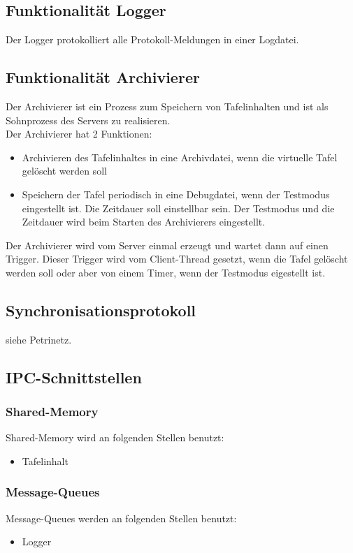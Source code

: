 \subsection{Funktionalität Logger}
Der Logger protokolliert alle Protokoll-Meldungen in einer Logdatei.

\subsection{Funktionalität Archivierer}
Der Archivierer ist ein Prozess zum Speichern von Tafelinhalten und ist als Sohnprozess des Servers zu realisieren. \\
Der Archivierer hat 2 Funktionen:
\begin{itemize}
 \item Archivieren des Tafelinhaltes in eine Archivdatei, wenn die virtuelle Tafel gelöscht werden soll
 \item Speichern der Tafel periodisch in eine Debugdatei, wenn der Testmodus eingestellt ist. Die Zeitdauer soll 
einstellbar sein. Der Testmodus und die Zeitdauer wird beim Starten des Archivierers eingestellt.
\end{itemize}
Der Archivierer wird vom Server einmal erzeugt und wartet dann auf einen Trigger. Dieser Trigger wird vom Client-Thread 
gesetzt, wenn die Tafel gelöscht werden soll oder aber von einem Timer, wenn der Testmodus eigestellt ist.

\subsection{Synchronisationsprotokoll}
siehe Petrinetz.

\subsection{IPC-Schnittstellen}

\subsubsection{Shared-Memory}
Shared-Memory wird an folgenden Stellen benutzt:
\begin{itemize}
 \item Tafelinhalt
\end{itemize}

\subsubsection{Message-Queues}
Message-Queues werden an folgenden Stellen benutzt:
\begin{itemize}
 \item Logger
\end{itemize}

